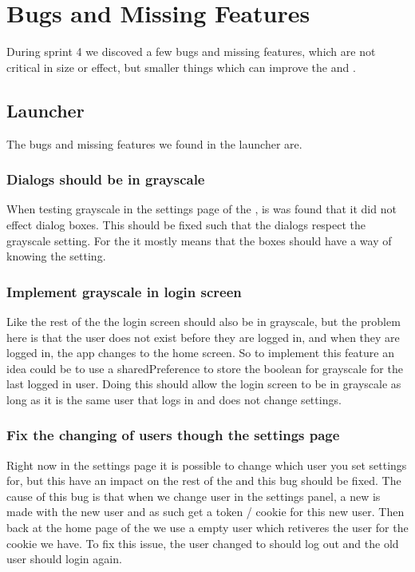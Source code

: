 \section{Bugs and Missing Features}
During sprint 4 we discoved a few bugs and missing features, which are not
critical in size or effect, but smaller things which can improve the
 and .

\subsection{Launcher}
The bugs and missing features we found in the launcher are.

\subsubsection{Dialogs should be in grayscale}
When testing grayscale in the settings page of the , is was
found that it did not effect dialog boxes. This should be fixed such that the
dialogs respect the grayscale setting. For the  it mostly means
that the boxes should have a way of knowing the setting.

\subsubsection{Implement grayscale in login screen}
Like the rest of the  the login screen should also be in
grayscale, but the problem here is that the user does not exist before they are
logged in, and when they are logged in, the app changes to the home screen. So
to implement this feature an idea could be to use a sharedPreference to store
the boolean for grayscale for the last logged in user. Doing this should allow
the login screen to be in grayscale as long as it is the same user that logs
in and does not change settings.

\subsubsection{Fix the changing of users though the settings page}
Right now in the settings page it is possible to change which user you set
settings for, but this have an impact on the rest of the  and
this bug should be fixed. The cause of this bug is that when we change user in
the settings panel, a new  is made with the new user and as
such get a token / cookie for this new user. Then back at the home page of the
 we use a empty user  which retiveres the user
for the cookie we have. To fix this issue, the user changed to should log out
and the old user should login again.

